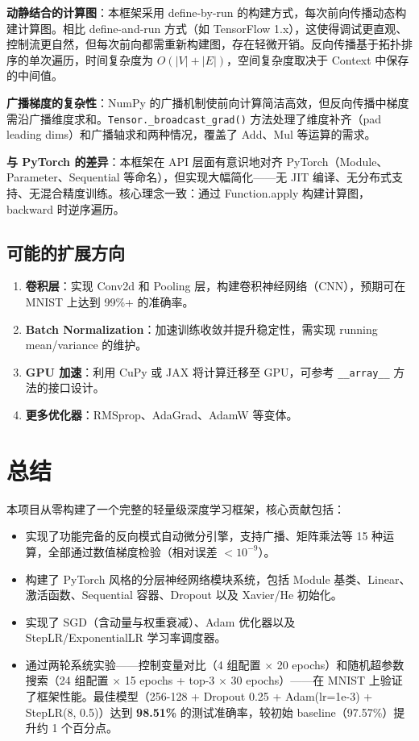 \documentclass[12pt,a4paper]{ctexart}
\begin{document}
\textbf{动静结合的计算图}：本框架采用 define-by-run 的构建方式，每次前向传播动态构建计算图。相比 define-and-run 方式（如 TensorFlow 1.x），这使得调试更直观、控制流更自然，但每次前向都需重新构建图，存在轻微开销。反向传播基于拓扑排序的单次遍历，时间复杂度为 $O(|V|+|E|)$，空间复杂度取决于 Context 中保存的中间值。

\textbf{广播梯度的复杂性}：NumPy 的广播机制使前向计算简洁高效，但反向传播中梯度需沿广播维度求和。\texttt{Tensor.\_broadcast\_grad()} 方法处理了维度补齐（pad leading dims）和广播轴求和两种情况，覆盖了 Add、Mul 等运算的需求。

\textbf{与 PyTorch 的差异}：本框架在 API 层面有意识地对齐 PyTorch（Module、Parameter、Sequential 等命名），但实现大幅简化——无 JIT 编译、无分布式支持、无混合精度训练。核心理念一致：通过 Function.apply 构建计算图，backward 时逆序遍历。

\subsection{可能的扩展方向}

\begin{enumerate}
    \item \textbf{卷积层}：实现 Conv2d 和 Pooling 层，构建卷积神经网络（CNN），预期可在 MNIST 上达到 99\%+ 的准确率。
    \item \textbf{Batch Normalization}：加速训练收敛并提升稳定性，需实现 running mean/variance 的维护。
    \item \textbf{GPU 加速}：利用 CuPy 或 JAX 将计算迁移至 GPU，可参考 \texttt{\_\_array\_\_} 方法的接口设计。
    \item \textbf{更多优化器}：RMSprop、AdaGrad、AdamW 等变体。
\end{enumerate}

\section{总结}

本项目从零构建了一个完整的轻量级深度学习框架，核心贡献包括：

\begin{itemize}
    \item 实现了功能完备的反向模式自动微分引擎，支持广播、矩阵乘法等 15 种运算，全部通过数值梯度检验（相对误差 $< 10^{-9}$）。
    \item 构建了 PyTorch 风格的分层神经网络模块系统，包括 Module 基类、Linear、激活函数、Sequential 容器、Dropout 以及 Xavier/He 初始化。
    \item 实现了 SGD（含动量与权重衰减）、Adam 优化器以及 StepLR/ExponentialLR 学习率调度器。
    \item 通过两轮系统实验——控制变量对比（4 组配置 $\times$ 20 epochs）和随机超参数搜索（24 组配置 $\times$ 15 epochs + top-3 $\times$ 30 epochs）——在 MNIST 上验证了框架性能。最佳模型（256-128 + Dropout 0.25 + Adam(lr=1e-3) + StepLR(8, 0.5)）达到 \textbf{98.51\%} 的测试准确率，较初始 baseline（97.57\%）提升约 1 个百分点。
\end{itemize}
\end{document}
